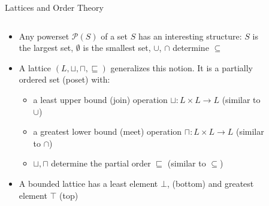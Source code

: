 \documentclass[aspectratio=169]{beamer}
\begin{document}
\begingroup
\small
\begin{frame}{Lattices and Order Theory}
  \begin{columns}[T]
  \begin{column}{0.6\textwidth}
  \begin{itemize}[<+->]
  \item Any powerset $\mathcal{P}(S)$ of a set $S$ has an interesting structure:
     $S$ is the largest set,
     $\emptyset$ is the smallest set,
     $\cup$, $\cap$ determine $\subseteq$
  \item A lattice $(L, \sqcup, \sqcap, \sqsubseteq)$ generalizes this notion. It is a partially ordered set (poset) with:
    \begin{itemize}\footnotesize
    \item a least upper bound (join) operation $\sqcup: L \times L \to L$ (similar to $\cup$)
    \item a greatest lower bound (meet) operation $\sqcap: L \times L \to L$ (similar to $\cap$)
    \item $\sqcup, \sqcap$ determine the partial order $\sqsubseteq$ (similar to $\subseteq$)
    \end{itemize}
  \item A bounded lattice has a least element $\bot$, (bottom)
    and greatest element $\top$ (top)
  \end{itemize}
  \end{column}
  \begin{column}{0.4\textwidth}
    \begin{figure}[h]
    \centering

\end{figure}
\end{column}
\end{columns}
\end{frame}
\end{document}
